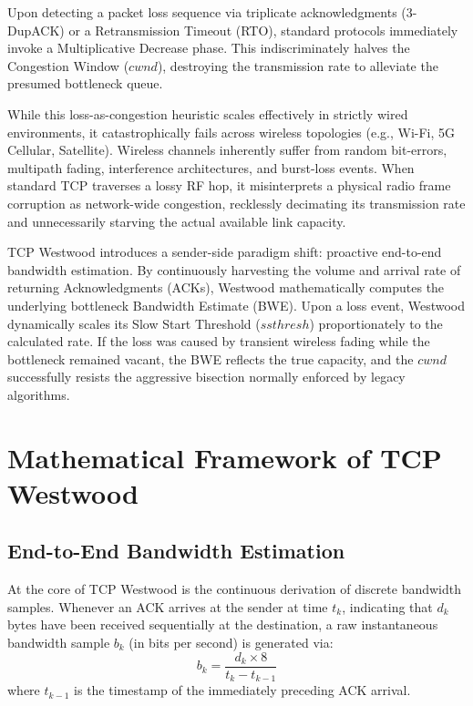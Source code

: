 \documentclass[conference,10pt,a4paper]{IEEEtran}
\begin{document}
Upon detecting a packet loss sequence via triplicate acknowledgments (3-DupACK) or a Retransmission Timeout (RTO), standard protocols immediately invoke a Multiplicative Decrease phase. This indiscriminately halves the Congestion Window ($cwnd$), destroying the transmission rate to alleviate the presumed bottleneck queue.

While this loss-as-congestion heuristic scales effectively in strictly wired environments, it catastrophically fails across wireless topologies (e.g., Wi-Fi, 5G Cellular, Satellite). Wireless channels inherently suffer from random bit-errors, multipath fading, interference architectures, and burst-loss events. When standard TCP traverses a lossy RF hop, it misinterprets a physical radio frame corruption as network-wide congestion, recklessly decimating its transmission rate and unnecessarily starving the actual available link capacity.

TCP Westwood \cite{casetti2001tcp} introduces a sender-side paradigm shift: proactive end-to-end bandwidth estimation. By continuously harvesting the volume and arrival rate of returning Acknowledgments (ACKs), Westwood mathematically computes the underlying bottleneck Bandwidth Estimate (BWE). Upon a loss event, Westwood dynamically scales its Slow Start Threshold ($ssthresh$) proportionately to the calculated rate. If the loss was caused by transient wireless fading while the bottleneck remained vacant, the BWE reflects the true capacity, and the $cwnd$ successfully resists the aggressive bisection normally enforced by legacy algorithms.

\section{Mathematical Framework of TCP Westwood}

\subsection{End-to-End Bandwidth Estimation}
At the core of TCP Westwood is the continuous derivation of discrete bandwidth samples. Whenever an ACK arrives at the sender at time $t_k$, indicating that $d_k$ bytes have been received sequentially at the destination, a raw instantaneous bandwidth sample $b_{k}$ (in bits per second) is generated via:
\begin{equation}
b_{k} = \frac{d_k \times 8}{t_k - t_{k-1}}
\label{eq:raw_sample}
\end{equation}
where $t_{k-1}$ is the timestamp of the immediately preceding ACK arrival.
\end{document}
